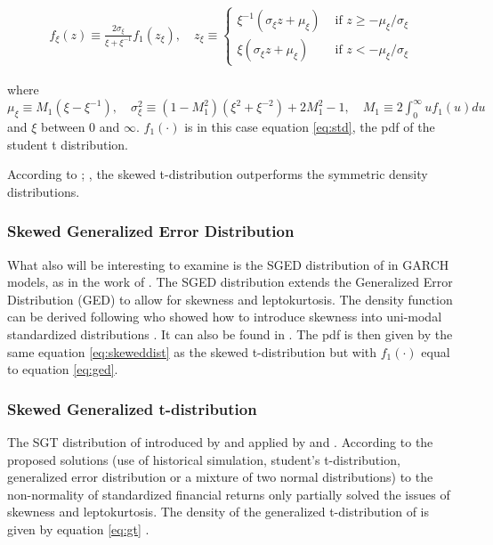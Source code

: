 \documentclass[a4paper, twoside]{templates/ociamthesis}
\begin{document}
\begin{align}
f_{\xi}(z) \equiv \frac{2 \sigma_{\xi}}{\xi+\xi^{-1}} f_{1}\left(z_{\xi}\right), \quad z_{\xi} \equiv\left\{\begin{array}{ll}
\xi^{-1}\left(\sigma_{\xi} z+\mu_{\xi}\right) & \text { if } z \geq-\mu_{\xi} / \sigma_{\xi} \\
\xi\left(\sigma_{\xi} z+\mu_{\xi}\right) & \text { if } z<-\mu_{\xi} / \sigma_{\xi}
\end{array}\right.
 \label{eq:skeweddist}
\end{align}

\noindent where \(\mu_{\xi} \equiv M_{1}\left(\xi-\xi^{-1}\right), \quad \sigma_{\xi}^{2} \equiv\left(1-M_{1}^{2}\right)\left(\xi^{2}+\xi^{-2}\right)+2 M_{1}^{2}-1, \quad M_{1} \equiv 2 \int_{0}^{\infty} u f_{1}(u) d u\) and \(\xi\) between \(0\) and \(\infty\). \(f_1(\cdot)\) is in this case equation \eqref{eq:std}, the pdf of the student t distribution.

\noindent According to \textcite{giot2003}; \textcite{giot2004}, the skewed t-distribution outperforms the symmetric density distributions.

\hypertarget{skewed-generalized-error-distribution}{%
\subsubsection{Skewed Generalized Error Distribution}\label{skewed-generalized-error-distribution}}

\noindent What also will be interesting to examine is the SGED distribution of \textcite{theodossiou2000} in GARCH models, as in the work of \textcite{lee2008}. The SGED distribution extends the Generalized Error Distribution (GED) to allow for skewness and leptokurtosis. The density function can be derived following \textcite{fernández1998} who showed how to introduce skewness into uni-modal standardized distributions \autocite{trottier2015}. It can also be found in \textcite{theodossiou2000}. The pdf is then given by the same equation \eqref{eq:skeweddist} as the skewed t-distribution but with \(f_1(\cdot)\) equal to equation \eqref{eq:ged}.

\hypertarget{skewed-generalized-t-distribution}{%
\subsubsection{Skewed Generalized t-distribution}\label{skewed-generalized-t-distribution}}

\noindent The SGT distribution of introduced by \textcite{theodossiou1998} and applied by \textcite{bali2007} and \textcite{bali2008}. According to \textcite{bali2008} the proposed solutions (use of historical simulation, student's t-distribution, generalized error distribution or a mixture of two normal distributions) to the non-normality of standardized financial returns only partially solved the issues of skewness and leptokurtosis. The density of the generalized t-distribution of \textcite{mcdonald1988} is given by equation \eqref{eq:gt} \autocite{bollerslev1994}.
\end{document}
